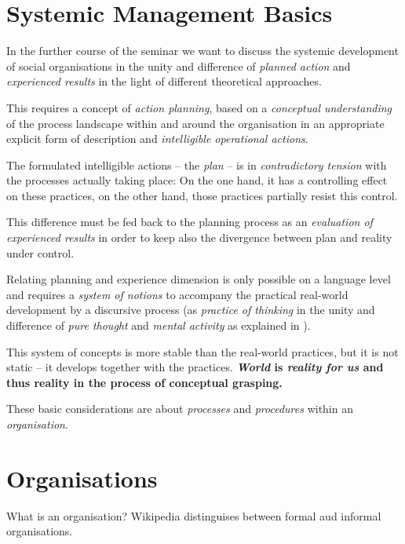 \documentclass[11pt,a4paper]{article}
\begin{document}
\section{Systemic Management Basics}

In the further course of the seminar we want to discuss the systemic
development of social organisations in the unity and difference of
\emph{planned action} and \emph{experienced results} in the light of different
theoretical approaches.

This requires a concept of \emph{action planning}, based on a \emph{conceptual
  understanding} of the process landscape within and around the organisation
in an appropriate explicit form of description and \emph{intelligible
  operational actions}.

The formulated intelligible actions -- the \emph{plan} -- is in
\emph{contradictory tension} with the processes actually taking place: On the
one hand, it has a controlling effect on these practices, on the other hand,
those practices partially resist this control.

This difference must be fed back to the planning process as an
\emph{evaluation of experienced results} in order to keep also the divergence
between plan and reality under control.

Relating planning and experience dimension is only possible on a language
level and requires a \emph{system of notions} to accompany the practical
real-world development by a discursive process (as \emph{practice of thinking}
in the unity and difference of \emph{pure thought} and \emph{mental activity}
as explained in \cite[p. 33-51]{MSM}).

This system of concepts is more stable than the real-world practices, but it
is not static -- it develops together with the practices.
\textbf{\emph{World} is \emph{reality for us} and thus reality in the process
  of conceptual grasping.}

These basic considerations are about \emph{processes} and \emph{procedures}
within an \emph{organisation}.

\section{Organisations}

What is an organisation? Wikipedia distinguises between formal aud informal
organisations. 
\end{document}
